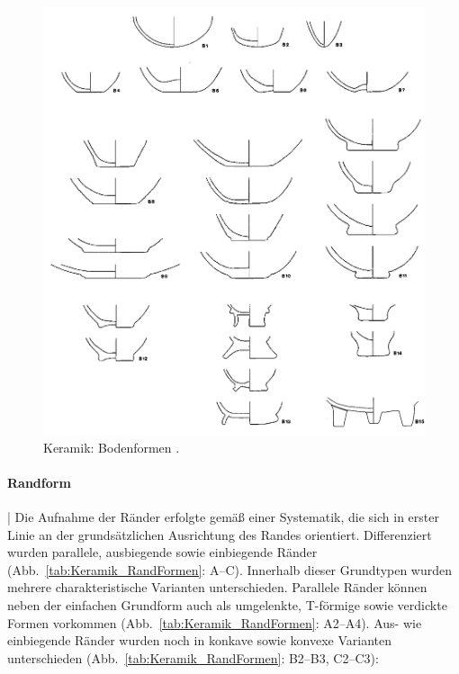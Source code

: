 \begin{multicols}{2}
\begin{figure}[!tb]
	\centering
	\includegraphics[width=.95\textwidth]{fig/Wotzka1995_440Taf6_modDS.jpg}
	\caption{Keramik: Bodenformen \parencite[nach][440 Taf.~6]{Wotzka.1995}.}
	\label{fig:Keramik_BodenFormen}
\end{figure}

\paragraph{Randform}\hspace{-.5em}|\hspace{.5em}\label{sec:Randform}
Die Aufnahme der Ränder erfolgte gemäß einer Systematik, die sich in erster Linie an der grundsätzlichen Ausrichtung des Randes orientiert. Differenziert wurden parallele, ausbiegende sowie einbiegende Ränder (Abb.~\ref{tab:Keramik_RandFormen}: A--C). Innerhalb dieser Grundtypen wurden mehrere charakteristische Varianten unterschieden. Parallele Ränder können neben der einfachen Grundform auch als umgelenkte, T-förmige sowie verdickte Formen vorkommen (Abb.~\ref{tab:Keramik_RandFormen}: A2--A4). Aus- wie einbiegende Ränder wurden noch in konkave sowie konvexe Varianten unterschieden (Abb.~\ref{tab:Keramik_RandFormen}: B2--B3, C2--C3):


\end{multicols}
